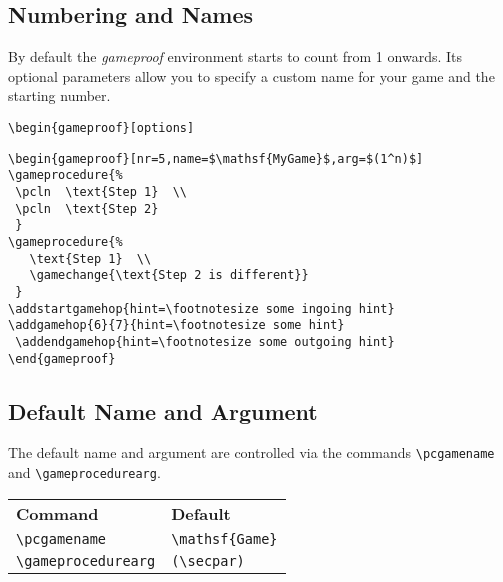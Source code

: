 \documentclass[a4paper]{report}
\begin{document}
\subsection{Numbering and Names}
By default the \emph{gameproof} environment starts to count from 1 onwards. Its optional parameters allow you to specify a custom
name for your game and the starting number.
\begin{lstlisting}
\begin{gameproof}[options]
\end{lstlisting}

\begin{center}
\begin{gameproof}[nr=5,name=\mathsf{MyGame},arg=(1^n)]
\end{gameproof}
\end{center}

\begin{lstlisting}
\begin{gameproof}[nr=5,name=$\mathsf{MyGame}$,arg=$(1^n)$]
\gameprocedure{%
 \pcln  \text{Step 1}  \\
 \pcln  \text{Step 2}
 }
\gameprocedure{%
   \text{Step 1}  \\
   \gamechange{\text{Step 2 is different}}
 }
\addstartgamehop{hint=\footnotesize some ingoing hint}
\addgamehop{6}{7}{hint=\footnotesize some hint}
 \addendgamehop{hint=\footnotesize some outgoing hint}
\end{gameproof}
\end{lstlisting}


\subsection{Default Name and Argument}
The default name and argument are controlled via the commands \lstinline$\pcgamename$ and \lstinline$\gameprocedurearg$.

\begin{center}
\begin{tabular}{ll}
\textbf{Command} & \textbf{Default} \\
\lstinline$\pcgamename$ & \lstinline$\mathsf{Game}$ \\
\lstinline$\gameprocedurearg$ & \lstinline$(\secpar)$
\end{tabular}
\end{center}
\end{document}
